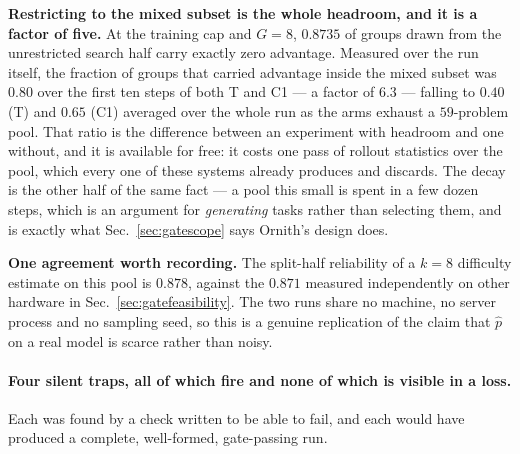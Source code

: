 \textbf{Restricting to the mixed subset is the whole headroom, and it is a factor of five.}
At the training cap and $G=8$, $\mathbf{0.8735}$ of groups drawn from the unrestricted search
half carry exactly zero advantage. Measured over the run itself, the fraction of groups that
carried advantage inside the mixed subset was $\mathbf{0.80}$ over the first ten steps of both
T and C1 --- a factor of $\mathbf{6.3}$ --- falling to $0.40$ (T) and $0.65$ (C1) averaged over
the whole run as the arms exhaust a $59$-problem pool. That ratio is the difference between an
experiment with headroom and one without, and it is available for free: it costs one pass of
rollout statistics over the pool, which every one of these systems already produces and
discards. The decay is the other half of the same fact --- a pool this small is spent in a few
dozen steps, which is an argument for \emph{generating} tasks rather than selecting them, and
is exactly what Sec.~\ref{sec:gatescope} says Ornith's design does.

\textbf{One agreement worth recording.} The split-half reliability of a $k=8$ difficulty
estimate on this pool is $\mathbf{0.878}$, against the $0.871$ measured independently on other
hardware in Sec.~\ref{sec:gatefeasibility}. The two runs share no machine, no server process
and no sampling seed, so this is a genuine replication of the claim that $\hat p$ on a real
model is scarce rather than noisy.

\paragraph{Four silent traps, all of which fire and none of which is visible in a loss.}
Each was found by a check written to be able to fail, and each would have produced a complete,
well-formed, gate-passing run.

